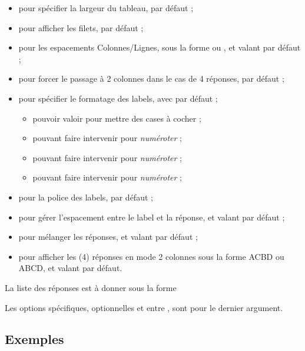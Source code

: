 \documentclass[french,11pt,a4paper]{article}
\begin{document}
\begin{itemize}
	\item {} pour spécifier la largeur du tableau,  par défaut ;
	\item {} pour afficher les filets,  par défaut ;
	\item {} pour les espacements Colonnes/Lignes, sous la forme  ou , et valant \MontreCode{6pt/2pt} par défaut ;
	\item {} pour forcer le passage à 2 colonnes dans le cas de 4 réponses,  par défaut ;
	\item {} pour spécifier le formatage des labels, avec  par défaut ;
	\begin{itemize}
		\item pouvoir valoir  pour mettre des cases à cocher ;
		\item pouvant faire intervenir  pour \textit{numéroter}  ;
		\item pouvant faire intervenir  pour \textit{numéroter}  ;
		\item pouvant faire intervenir  pour \textit{numéroter}  ;
	\end{itemize}
	\item {} pour la police des labels,  par défaut ;
	\item {} pour gérer l'espacement entre le label et la réponse, et valant  par défaut ;
	\item {} pour mélanger les réponses, et valant  par défaut ;
	\item {} pour afficher les (4) réponses en mode 2 colonnes sous la forme ACBD ou ABCD, et valant  par défaut.
\end{itemize}

La liste des réponses est à donner sous la forme 

Les options spécifiques, optionnelles et entre , sont pour le dernier argument.

\subsection{Exemples}
\end{document}
